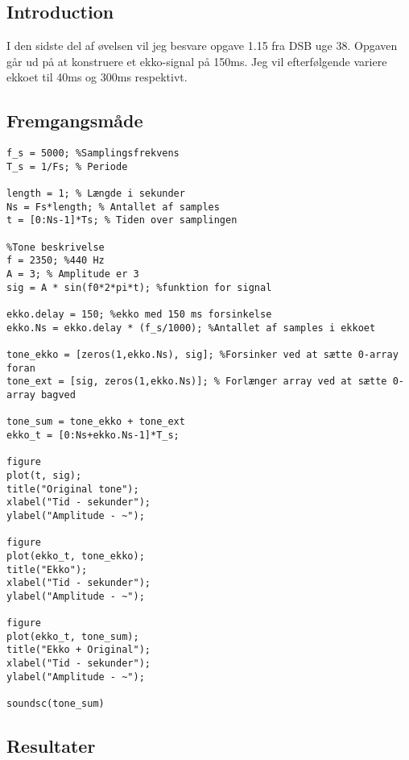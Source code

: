 \documentclass[../main.tex]{subfiles}
\begin{document}
\subsection{Introduction}

I den sidste del af øvelsen vil jeg besvare opgave 1.15 fra DSB uge 38. Opgaven går ud på at konstruere et ekko-signal på 150ms. Jeg vil efterfølgende variere ekkoet til 40ms og 300ms respektivt.

\subsection{Fremgangsmåde}

\begin{lstlisting}[caption={Matlab kode for øvelse 1.15, uge 39 DSB}, label={lst:myLSTpopsa}]
f_s = 5000; %Samplingsfrekvens
T_s = 1/Fs; % Periode

length = 1; % Længde i sekunder
Ns = Fs*length; % Antallet af samples
t = [0:Ns-1]*Ts; % Tiden over samplingen

%Tone beskrivelse
f = 2350; %440 Hz
A = 3; % Amplitude er 3
sig = A * sin(f0*2*pi*t); %funktion for signal

ekko.delay = 150; %ekko med 150 ms forsinkelse
ekko.Ns = ekko.delay * (f_s/1000); %Antallet af samples i ekkoet

tone_ekko = [zeros(1,ekko.Ns), sig]; %Forsinker ved at sætte 0-array foran
tone_ext = [sig, zeros(1,ekko.Ns)]; % Forlænger array ved at sætte 0-array bagved 

tone_sum = tone_ekko + tone_ext
ekko_t = [0:Ns+ekko.Ns-1]*T_s;

figure
plot(t, sig);
title("Original tone");
xlabel("Tid - sekunder");
ylabel("Amplitude - ~");

figure
plot(ekko_t, tone_ekko);
title("Ekko");
xlabel("Tid - sekunder");
ylabel("Amplitude - ~");

figure
plot(ekko_t, tone_sum);
title("Ekko + Original");
xlabel("Tid - sekunder");
ylabel("Amplitude - ~");

soundsc(tone_sum)

\end{lstlisting}

\subsection{Resultater}

\end{document}
